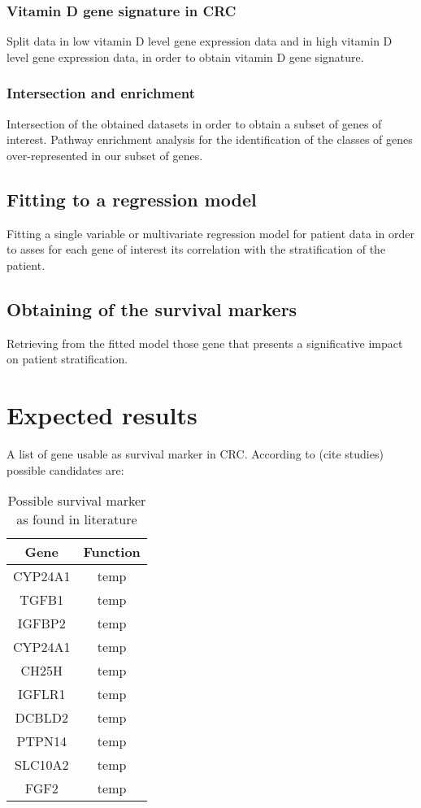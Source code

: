\documentclass[fleqn,10pt]{SelfArx} %
\begin{document}
		\subsubsection{Vitamin D gene signature in CRC}
		Split data in low vitamin D level gene expression data and in high vitamin D level gene expression data, in order to obtain vitamin D gene signature.


		\subsubsection{Intersection and enrichment}
		Intersection of the obtained datasets in order to obtain a subset of genes of interest. Pathway enrichment analysis for the identification of the classes of genes over-represented in our subset of genes.

	\subsection{Fitting to a regression model}
	Fitting a single variable or multivariate regression model for patient data in order to asses for each gene of interest its correlation with the stratification of the patient.

	\subsection{Obtaining of the survival markers}
	Retrieving from the fitted model those gene that presents a significative impact on patient stratification.

\section{Expected results}
A list of gene usable as survival marker in CRC.
According to (cite studies) possible candidates are:

\begin{table}[ht]
	\centering
	\begin{tabular}{cc}
		\hline
		Gene & Function\\
		\hline
		CYP24A1& temp\\
		TGFB1& temp\\
		IGFBP2& temp\\
		CYP24A1& temp\\
		CH25H& temp\\
		IGFLR1& temp\\
		DCBLD2& temp\\
		PTPN14& temp\\
		SLC10A2& temp\\
		FGF2& temp\\
		\hline
	\end{tabular}
	\label{tab:suvmark}
	\caption{Possible survival marker as found in literature}
\end{table}
\end{document}
